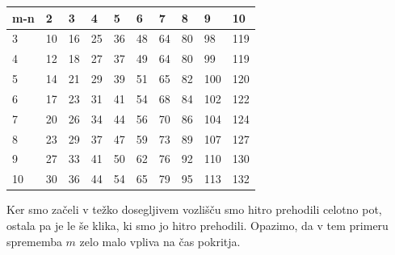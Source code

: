 \documentclass[12pt,a4paper]{amsart}
\begin{document}
\begin{table}[!ht]
    \centering
    \begin{tabular}{|l|l|l|l|l|l|l|l|l|l|}
    \hline
        m-n & 2 & 3 & 4 & 5 & 6 & 7 & 8 & 9 & 10 \\ \hline
        3 & 10 & 16 & 25 & 36 & 48 & 64 & 80 & 98 & 119 \\ \hline
        4 & 12 & 18 & 27 & 37 & 49 & 64 & 80 & 99 & 119 \\ \hline
        5 & 14 & 21 & 29 & 39 & 51 & 65 & 82 & 100 & 120 \\ \hline
        6 & 17 & 23 & 31 & 41 & 54 & 68 & 84 & 102 & 122 \\ \hline
        7 & 20 & 26 & 34 & 44 & 56 & 70 & 86 & 104 & 124 \\ \hline
        8 & 23 & 29 & 37 & 47 & 59 & 73 & 89 & 107 & 127 \\ \hline
        9 & 27 & 33 & 41 & 50 & 62 & 76 & 92 & 110 & 130 \\ \hline
        10 & 30 & 36 & 44 & 54 & 65 & 79 & 95 & 113 & 132 \\ \hline
    \end{tabular}
\end{table}

Ker smo začeli v težko dosegljivem vozlišču smo hitro prehodili celotno pot, ostala pa je le še klika, ki smo jo hitro
prehodili. Opazimo, da v tem primeru sprememba $m$ zelo malo vpliva na čas pokritja.
\end{document}
